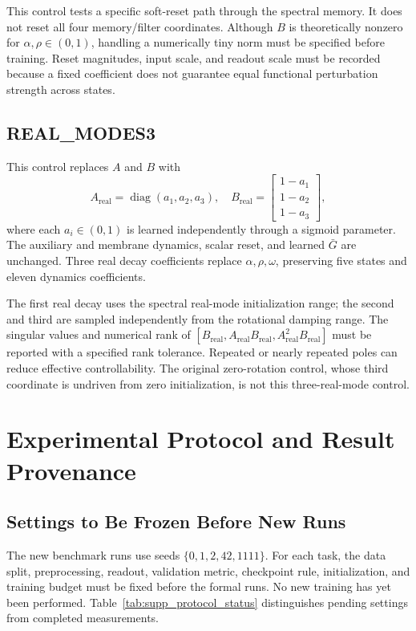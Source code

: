 \documentclass[letterpaper]{article}
\begin{document}
This control tests a specific soft-reset path through the spectral memory. It does not reset all four memory/filter coordinates. Although $B$ is theoretically nonzero for $\alpha,\rho\in(0,1)$, handling a numerically tiny norm must be specified before training. Reset magnitudes, input scale, and readout scale must be recorded because a fixed coefficient does not guarantee equal functional perturbation strength across states.

\subsection{REAL\_MODES3}

This control replaces $A$ and $B$ with
\begin{equation}
A_{\mathrm{real}}=\operatorname{diag}(a_1,a_2,a_3),\quad
B_{\mathrm{real}}=\begin{bmatrix}1-a_1\\1-a_2\\1-a_3\end{bmatrix},
\label{eq:supp_real_modes}
\end{equation}
where each $a_i\in(0,1)$ is learned independently through a sigmoid parameter. The auxiliary and membrane dynamics, scalar reset, and learned $\bar G$ are unchanged. Three real decay coefficients replace $\alpha,\rho,\omega$, preserving five states and eleven dynamics coefficients.

The first real decay uses the spectral real-mode initialization range; the second and third are sampled independently from the rotational damping range. The singular values and numerical rank of $[B_{\mathrm{real}},A_{\mathrm{real}}B_{\mathrm{real}},A_{\mathrm{real}}^2B_{\mathrm{real}}]$ must be reported with a specified rank tolerance. Repeated or nearly repeated poles can reduce effective controllability. The original zero-rotation control, whose third coordinate is undriven from zero initialization, is not this three-real-mode control.

\section{Experimental Protocol and Result Provenance}

\subsection{Settings to Be Frozen Before New Runs}

The new benchmark runs use seeds $\{0,1,2,42,1111\}$. For each task, the data split, preprocessing, readout, validation metric, checkpoint rule, initialization, and training budget must be fixed before the formal runs. No new training has yet been performed. Table~\ref{tab:supp_protocol_status} distinguishes pending settings from completed measurements.
\end{document}
